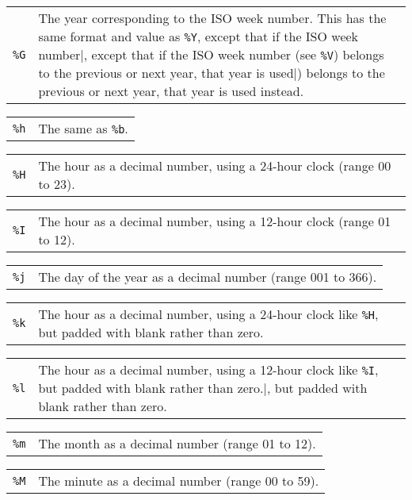 \documentclass[11pt]{report}
\begin{document}
\begin{tabular}{@{}p{20pt}p{421.5pt}@{}}
{\tt\%G}&The year corresponding to the ISO week number. This has the
same format and value as \verb|%Y|, except that if the ISO week number
(see \verb|%V|) belongs to the previous or next year, that year is used
instead.
\end{tabular}

\begin{tabular}{@{}p{20pt}p{421.5pt}@{}}
{\tt\%h}&The same as \verb|%b|.\\
\end{tabular}

\begin{tabular}{@{}p{20pt}p{421.5pt}@{}}
{\tt\%H}&The hour as a decimal number, using a 24-hour clock (range 00
to 23).\\
\end{tabular}

\begin{tabular}{@{}p{20pt}p{421.5pt}@{}}
{\tt\%I}&The hour as a decimal number, using a 12-hour clock (range 01
to 12).\\
\end{tabular}

\begin{tabular}{@{}p{20pt}p{421.5pt}@{}}
{\tt\%j}&The day of the year as a decimal number (range 001 to 366).\\
\end{tabular}

\begin{tabular}{@{}p{20pt}p{421.5pt}@{}}
{\tt\%k}&The hour as a decimal number, using a 24-hour clock like
\verb|%H|, but padded with blank rather than zero.\\
\end{tabular}

\begin{tabular}{@{}p{20pt}p{421.5pt}@{}}
{\tt\%l}&The hour as a decimal number, using a 12-hour clock like
\verb|%I|, but padded with blank rather than zero.
\end{tabular}

\begin{tabular}{@{}p{20pt}p{421.5pt}@{}}
{\tt\%m}&The month as a decimal number (range 01 to 12).\\
\end{tabular}

\begin{tabular}{@{}p{20pt}p{421.5pt}@{}}
{\tt\%M}&The minute as a decimal number (range 00 to 59).\\
\end{tabular}
\end{document}
